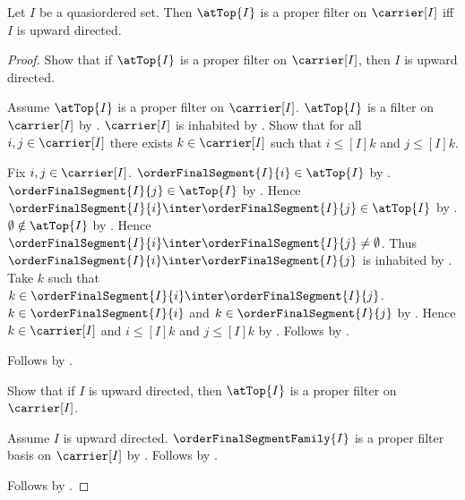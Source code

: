 \begin{theorem}\label{at_top_is_proper_iff_directed}
    Let $I$ be a quasiordered set.
    Then $\atTop{I}$ is a proper filter on $\carrier[I]$ iff
        $I$ is upward directed.
\end{theorem}
\begin{proof}
    Show that if $\atTop{I}$ is a proper filter on $\carrier[I]$, then
        $I$ is upward directed.
    \begin{subproof}
        Assume $\atTop{I}$ is a proper filter on $\carrier[I]$.
        $\atTop{I}$ is a filter on $\carrier[I]$ by
            .
        $\carrier[I]$ is inhabited by
            .
        Show that for all $i,j\in\carrier[I]$ there exists
            $k\in\carrier[I]$ such that
            $i\mathrel{\leq[I]}k$ and $j\mathrel{\leq[I]}k$.
        \begin{subproof}
            Fix $i,j\in\carrier[I]$.
            $\orderFinalSegment{I}{i}\in\atTop{I}$ by
                .
            $\orderFinalSegment{I}{j}\in\atTop{I}$ by
                .
            Hence $\orderFinalSegment{I}{i}\inter
                \orderFinalSegment{I}{j}\in\atTop{I}$ by
                .
            $\emptyset\notin\atTop{I}$ by .
            Hence $\orderFinalSegment{I}{i}\inter
                \orderFinalSegment{I}{j}\neq\emptyset$.
            Thus $\orderFinalSegment{I}{i}\inter
                \orderFinalSegment{I}{j}$ is inhabited by
                .
            Take $k$ such that $k\in\orderFinalSegment{I}{i}\inter
                \orderFinalSegment{I}{j}$.
            $k\in\orderFinalSegment{I}{i}$ and
                $k\in\orderFinalSegment{I}{j}$ by .
            Hence $k\in\carrier[I]$ and
                $i\mathrel{\leq[I]}k$ and
                $j\mathrel{\leq[I]}k$ by
                .
            Follows by \auto.
        \end{subproof}
        Follows by .
    \end{subproof}

    Show that if $I$ is upward directed, then
        $\atTop{I}$ is a proper filter on $\carrier[I]$.
    \begin{subproof}
        Assume $I$ is upward directed.
        $\orderFinalSegmentFamily{I}$ is a proper filter basis on
            $\carrier[I]$ by
            .
        Follows by
            .
    \end{subproof}
    Follows by \auto.
\end{proof}


